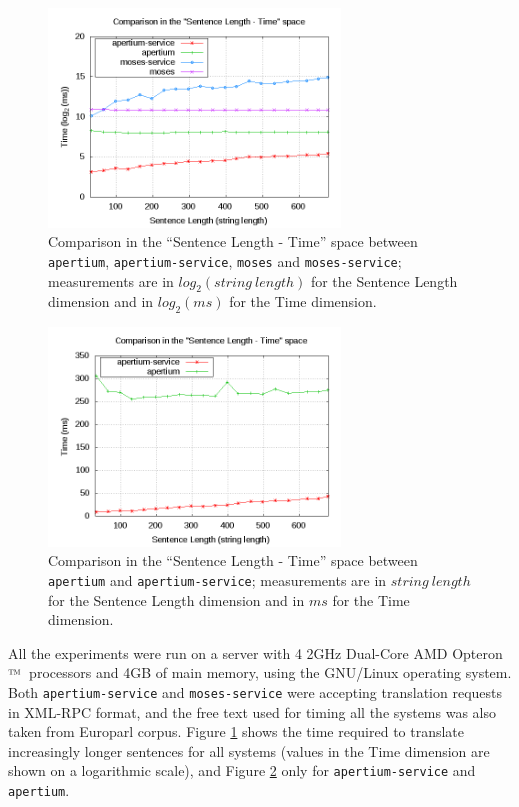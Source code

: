 \documentclass[11pt]{article}
\begin{document}
\begin{figure}[!ht]
\begin{center}
\includegraphics[width=7.75cm]{comp}
\end{center}
\caption{Comparison in the ``Sentence Length - Time'' space between {\tt apertium}, {\tt apertium-service}, {\tt moses} and {\tt moses-service}; measurements are in $log_{2}(string\ length)$ for the Sentence Length dimension and in $log_{2}(ms)$ for the Time dimension.}
\label{fig:comp}
\end{figure}

\begin{figure}[!ht]
\begin{center}
\includegraphics[width=7.75cm]{compap}
\end{center}
\caption{Comparison in the ``Sentence Length - Time'' space between {\tt apertium} and {\tt apertium-service}; measurements are in $string\ length$ for the Sentence Length dimension and in $ms$ for the Time dimension.}
\label{fig:compap}
\end{figure}


All the experiments were run on a server with 4 2GHz Dual-Core AMD Opteron${\mbox{\small\texttrademark}}$\ processors and 4GB of main memory, using the GNU/Linux operating system. Both {\tt apertium-service} and {\tt moses-service} were accepting translation requests in XML-RPC format, and the free text used for timing all the systems was also taken from Europarl corpus. Figure \ref{fig:comp} shows the time required to translate increasingly longer sentences for all systems (values in the Time dimension are shown on a logarithmic scale), and Figure \ref{fig:compap} only for {\tt apertium-service} and {\tt apertium}.
\end{document}
